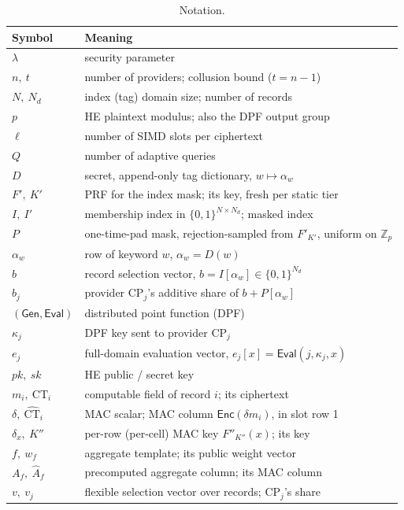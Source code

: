 \documentclass[a4paper,fleqn]{cas-sc}
\newcommand{\Gen}{\mathsf{Gen}}
\newcommand{\Eval}{\mathsf{Eval}}
\newcommand{\Enc}{\mathsf{Enc}}
\begin{document}
\begin{table}[pos=htbp]
\caption{Notation.}
\label{tab:notation}
\centering
\footnotesize
\setlength{\tabcolsep}{4pt}
\begin{tabular}{@{}l>{\raggedright\arraybackslash}p{5.5cm}@{}}
\toprule
Symbol & Meaning \\
\midrule
$\lambda$ & security parameter \\
$n,\ t$ & number of providers; collusion bound ($t=n-1$) \\
$N,\ N_d$ & index (tag) domain size; number of records \\
$p$ & HE plaintext modulus; also the DPF output group \\
$\ell$ & number of SIMD slots per ciphertext \\
$Q$ & number of adaptive queries \\
$D$ & secret, append-only tag dictionary, $w\mapsto\alpha_w$ \\
$F',\ K'$ & PRF for the index mask; its key, fresh per static tier \\
$I,\ I'$ & membership index in $\{0,1\}^{N\times N_d}$; masked index \\
$P$ & one-time-pad mask, rejection-sampled from $F'_{K'}$, uniform on
$\mathbb{Z}_p$ \\
$\alpha_w$ & row of keyword $w$, $\alpha_w=D(w)$ \\
$b$ & record selection vector, $b=I[\alpha_w]\in\{0,1\}^{N_d}$ \\
$b_j$ & provider $\text{CP}_j$'s additive share of $b+P[\alpha_w]$ \\
$(\Gen,\Eval)$ & distributed point function (DPF) \\
$\kappa_j$ & DPF key sent to provider $\text{CP}_j$ \\
$e_j$ & full-domain evaluation vector, $e_j[x]=\Eval(j,\kappa_j,x)$ \\
$pk,\ sk$ & HE public / secret key \\
$m_i,\ \text{CT}_i$ & computable field of record $i$; its ciphertext \\
$\delta,\ \widehat{\text{CT}}_i$ & MAC scalar; MAC column $\Enc(\delta m_i)$,
in slot row 1 \\
$\delta_x,\ K''$ & per-row (per-cell) MAC key $F''_{K''}(x)$; its key \\
$f,\ w_f$ & aggregate template; its public weight vector \\
$A_f,\ \widehat{A}_f$ & precomputed aggregate column; its MAC column \\
$v,\ v_j$ & flexible selection vector over records; $\text{CP}_j$'s share \\

\end{tabular}
\end{table}
\end{document}
